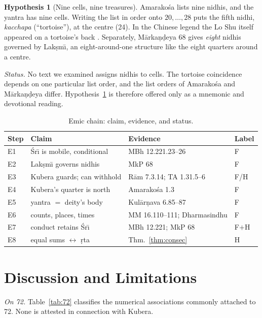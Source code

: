 \documentclass[journal]{IEEEtran}
\theoremstyle{definition}
\newtheorem{hypothesis}{Hypothesis}
\begin{document}
\begin{hypothesis}[Nine cells, nine treasures]\label{hyp:nidhi}
Amarako\'sa lists nine nidhis, and the yantra has nine cells. Writing the list in order onto $20,\dots,28$ puts the fifth nidhi, \emph{kacchapa} (``tortoise''), at the centre (24). In the Chinese legend the Lo Shu itself appeared on a tortoise's back \cite{wiki_luoshu}. Separately, M\=arka\d n\d deya 68 gives \emph{eight} nidhis governed by Lak\d sm\=\i{}, an eight-around-one structure like the eight quarters around a centre.
\end{hypothesis}
\noindent \emph{Status.} No text we examined assigns nidhis to cells. The tortoise coincidence depends on one particular list order, and the list orders of Amarako\'sa and M\=arka\d n\d deya differ. Hypothesis~\ref{hyp:nidhi} is therefore offered only as a mnemonic and devotional reading.

\begin{table}[t]
\caption{Emic chain: claim, evidence, and status.}
\label{tab:chain}
\centering\footnotesize
\setlength{\tabcolsep}{2pt}
\begin{tabular}{@{}p{}p{}p{}p{}@{}}
\toprule
Step & Claim & Evidence & Label\\
\midrule
E1 & \'Sr\=\i{} is mobile, conditional & MBh 12.221.23--26 & F\\
E2 & Lak\d sm\=\i{} governs nidhis & MkP 68 & F\\
E3 & Kubera guards; can withhold & R\=am 7.3.14; TA 1.31.5--6 & F/H\\
E4 & Kubera's quarter is north & Amarako\'sa 1.3 & F\\
E5 & yantra $=$ deity's body & Kul\=ar\d nava 6.85--87 & F\\
E6 & counts, places, times & MM 16.110--111; Dharmasindhu & F\\
E7 & conduct retains \'Sr\=\i & MBh 12.221; MkP 68 & F$+$H\\
E8 & equal sums $\leftrightarrow$ \d rta & Thm.~\ref{thm:consec} & H\\
\bottomrule
\end{tabular}
\end{table}

\section{Discussion and Limitations}
\label{sec:disc}
\emph{On 72.} Table~\ref{tab:72} classifies the numerical associations commonly attached to 72. None is attested in connection with Kubera.
\end{document}

